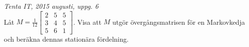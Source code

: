 {\it Tenta IT, 2015 augusti, uppg. 6}\\
Låt $M=\frac{1}{12}\begin{bmatrix}2&5&5\\3&4&5\\5&6&1\end{bmatrix}$. Visa att $M$ utgör övergångsmatrisen för en Markovkedja och beräkna dennas stationära fördelning.
